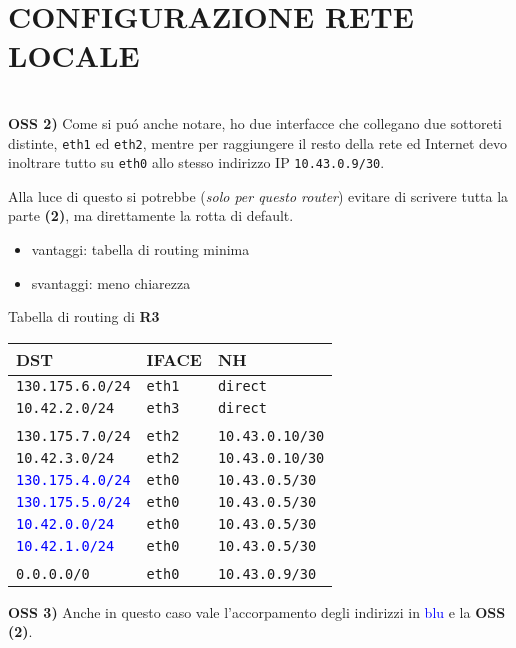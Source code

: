 \documentclass{article}
\def\code#1{\texttt{#1}}
\newenvironment{homeworkProblem}[1][-1]{
    \section{CONFIGURAZIONE RETE LOCALE}
}{}
\begin{document}
\begin{homeworkProblem}
	\textbf{\\OSS 2)} Come si pu\'o anche notare, ho due interfacce che collegano due sottoreti distinte, 
	\code{eth1} ed \code{eth2}, mentre per raggiungere il resto della rete ed Internet devo inoltrare tutto 
	su \code{eth0} allo stesso indirizzo IP \code{10.43.0.9/30}.
	
	Alla luce di questo si potrebbe (\emph{solo per questo router}) evitare di scrivere tutta la parte 
	\textbf{(2)}, ma direttamente la rotta di default.
	\begin{itemize}[noitemsep]
		\item vantaggi: tabella di routing minima
		\item svantaggi: meno chiarezza
	\end{itemize}
	
	\textit{}\newline %
	Tabella di routing di \textbf{R3}\\
	\begin{center}
 	\begin{tabular}{l l l}
  		\textbf{DST} & \textbf{IFACE} & \textbf{NH} \\
  		\hline
 		\code{130.175.6.0/24} & \code{eth1} & \code{direct} \\
 		\code{10.42.2.0/24}   & \code{eth3} & \code{direct} \\\\
 		
 		\code{130.175.7.0/24} & \code{eth2} & \code{10.43.0.10/30}\\
        \code{10.42.3.0/24}   & \code{eth2} & \code{10.43.0.10/30}\\         		
	    \textcolor{blue}{\code{130.175.4.0/24}} & \code{eth0} & \code{10.43.0.5/30}\\
 		\textcolor{blue}{\code{130.175.5.0/24}} & \code{eth0} & \code{10.43.0.5/30}\\         		
 		\textcolor{blue}{\code{10.42.0.0/24}}   & \code{eth0} & \code{10.43.0.5/30}\\
 		\textcolor{blue}{\code{10.42.1.0/24}}   & \code{eth0} & \code{10.43.0.5/30}\\\\
 		
 		\code{0.0.0.0/0} & \code{eth0} & \code{10.43.0.9/30}\\ 		
 	\end{tabular}
	\end{center}	
	\textbf{OSS 3)} Anche in questo caso vale l'accorpamento degli indirizzi in \textcolor{blue}{blu} e la 
	\textbf{OSS (2)}.
	

\end{homeworkProblem}
\end{document}
